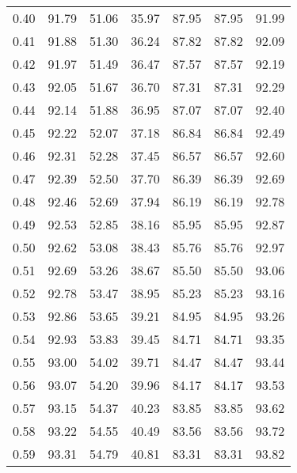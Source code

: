 \begin{tabular}{|c|c|c|c|c|c|c|}
      0.40 &     91.79 &     51.06 &      35.97 &   87.95 &      87.95 &         91.99 \\
      0.41 &     91.88 &     51.30 &      36.24 &   87.82 &      87.82 &         92.09 \\
      0.42 &     91.97 &     51.49 &      36.47 &   87.57 &      87.57 &         92.19 \\
      0.43 &     92.05 &     51.67 &      36.70 &   87.31 &      87.31 &         92.29 \\
      0.44 &     92.14 &     51.88 &      36.95 &   87.07 &      87.07 &         92.40 \\
      0.45 &     92.22 &     52.07 &      37.18 &   86.84 &      86.84 &         92.49 \\
      0.46 &     92.31 &     52.28 &      37.45 &   86.57 &      86.57 &         92.60 \\
      0.47 &     92.39 &     52.50 &      37.70 &   86.39 &      86.39 &         92.69 \\
      0.48 &     92.46 &     52.69 &      37.94 &   86.19 &      86.19 &         92.78 \\
      0.49 &     92.53 &     52.85 &      38.16 &   85.95 &      85.95 &         92.87 \\
      0.50 &     92.62 &     53.08 &      38.43 &   85.76 &      85.76 &         92.97 \\
      0.51 &     92.69 &     53.26 &      38.67 &   85.50 &      85.50 &         93.06 \\
      0.52 &     92.78 &     53.47 &      38.95 &   85.23 &      85.23 &         93.16 \\
      0.53 &     92.86 &     53.65 &      39.21 &   84.95 &      84.95 &         93.26 \\
      0.54 &     92.93 &     53.83 &      39.45 &   84.71 &      84.71 &         93.35 \\
      0.55 &     93.00 &     54.02 &      39.71 &   84.47 &      84.47 &         93.44 \\
      0.56 &     93.07 &     54.20 &      39.96 &   84.17 &      84.17 &         93.53 \\
      0.57 &     93.15 &     54.37 &      40.23 &   83.85 &      83.85 &         93.62 \\
      0.58 &     93.22 &     54.55 &      40.49 &   83.56 &      83.56 &         93.72 \\
      0.59 &     93.31 &     54.79 &      40.81 &   83.31 &      83.31 &         93.82 \\

\end{tabular}
